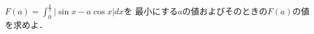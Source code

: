 \documentclass[../../main.tex]{subfiles}
\begin{document}
$\displaystyle F(a)=\int_0^{\frac{\pi}{2}}|\sin x-a\cos x|dx$を
最小にする$a$の値およびそのときの$F(a)$の値を求めよ．
\end{document}
